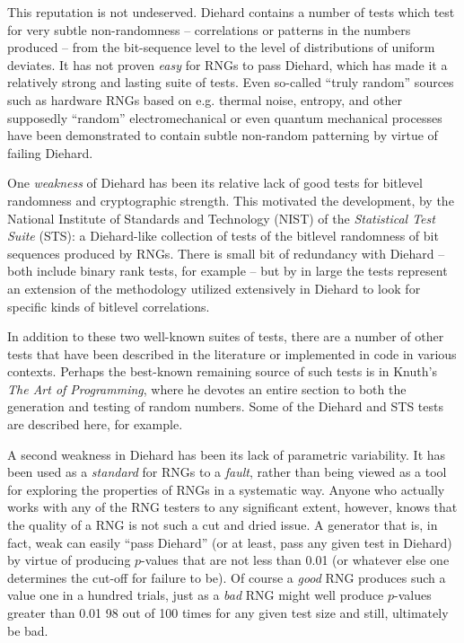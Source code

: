 \documentclass[12pt]{article}
\begin{document}
This reputation is not undeserved.  Diehard contains a number of tests
which test for very subtle non-randomness -- correlations or patterns in
the numbers produced -- from the bit-sequence level to the level of
distributions of uniform deviates.  It has not proven {\em easy} for
RNGs to pass Diehard, which has made it a relatively strong and lasting
suite of tests.  Even so-called ``truly random'' sources such as
hardware RNGs based on e.g. thermal noise, entropy, and other supposedly
``random'' electromechanical or even quantum mechanical processes have
been demonstrated to contain subtle non-random patterning by virtue of
failing Diehard.

One {\em weakness} of Diehard has been its relative lack of good tests
for bitlevel randomness and cryptographic strength.  This motivated the
development, by the National Institute of Standards and Technology
(NIST) of the {\em Statistical Test Suite} (STS): a Diehard-like
collection of tests of the bitlevel randomness of bit sequences produced
by RNGs\cite{STS}.  There is small bit of redundancy with Diehard --
both include binary rank tests, for example -- but by in large the tests
represent an extension of the methodology utilized extensively in
Diehard to look for specific kinds of bitlevel correlations.

In addition to these two well-known suites of tests, there are a number
of other tests that have been described in the literature or implemented
in code in various contexts.  Perhaps the best-known remaining source of
such tests is in Knuth's {\em The Art of Programming}\cite{Knuth}, where
he devotes an entire section to both the generation and testing of
random numbers.  Some of the Diehard and STS tests are described here,
for example.

A second weakness in Diehard has been its lack of parametric
variability.  It has been used as a {\em standard} for RNGs to a {\em
fault}, rather than being viewed as a tool for exploring the properties
of RNGs in a systematic way.  Anyone who actually works with any of the
RNG testers to any significant extent, however, knows that the quality
of a RNG is not such a cut and dried issue.  A generator that is, in
fact, weak can easily ``pass Diehard'' (or at least, pass any given test
in Diehard) by virtue of producing $p$-values that are not less than
0.01 (or whatever else one determines the cut-off for failure to be).
Of course a {\em good} RNG produces such a value one in a hundred
trials, just as a {\em bad} RNG might well produce $p$-values greater
than 0.01 98 out of 100 times for any given test size and still,
ultimately be bad.
\end{document}
